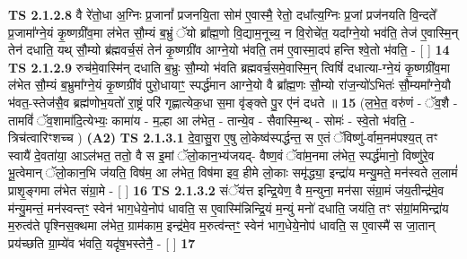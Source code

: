 \documentclass[17pt]{extarticle}
\begin{document}
                  \newline
                                \textbf{ TS 2.1.2.8} \newline
                  वै रे॑तो॒धा अ॒ग्निः प्र॒जानां᳚ प्रजनयि॒ता सोम॑ ए॒वास्मै॒ रेतो॒ दधा᳚त्य॒ग्निः प्र॒जां प्रज॑नयति वि॒न्दते᳚ प्र॒जामा᳚ग्ने॒यं कृ॒ष्णग्री॑व॒मा ल॑भेत सौ॒म्यं ब॒भ्रुं ॅयो ब्रा᳚ह्म॒णो वि॒द्याम॒नूच्य॒ न वि॒रोचे॑त॒ यदा᳚ग्ने॒यो भव॑ति॒ तेज॑ ए॒वास्मि॒न् तेन॑ दधाति॒ यथ् सौ॒म्यो ब्र॑ह्मवर्च॒सं तेन॑ कृ॒ष्णग्री॑व आग्ने॒यो भ॑वति॒ तम॑ ए॒वास्मा॒दप॑ हन्ति श्वे॒तो भ॑वति॒ - [  ] \textbf{  14} \newline
                  \newline
                                \textbf{ TS 2.1.2.9} \newline
                  रुच॑मे॒वास्मि॑न् दधाति ब॒भ्रुः सौ॒म्यो भ॑वति ब्रह्मवर्च॒समे॒वास्मि॒न् त्विषिं॑ दधात्या-ग्ने॒यं कृ॒ष्णग्री॑व॒मा ल॑भेत सौ॒म्यं ब॒भ्रुमा᳚ग्ने॒यं कृ॒ष्णग्री॑वं पुरो॒धायाꣳ॒॒ स्पर्द्ध॑मान आग्ने॒यो वै ब्रा᳚ह्म॒णः सौ॒म्यो रा॑ज॒न्यो॑ऽभितः॑ सौ॒म्यमा᳚ग्ने॒यौ भ॑वत॒-स्तेज॑सै॒व ब्रह्म॑णोभ॒यतो॑ रा॒ष्ट्रं परि॑ गृह्णात्येक॒धा स॒मा वृ॑ङ्क्ते पु॒र ए॑नं दधते ॥ \textbf{  15} \newline
                  \newline
                      (ल॒भे॒त॒ वरु॑णं - ॅव॒शै - तामविं॑ ॅव॒शामा॑दि॒त्येभ्यः॒ कामा॑य - म॒ल्हा आ ल॑भेत॒ - तान्ये॒व - सैवास्मि॒न्थ् - सोमः॑ - स्वे॒तो भ॑वति॒ - त्रिच॑त्वारिꣳशच्च )  \textbf{(A2)} \newline \newline
                                        \textbf{ TS 2.1.3.1} \newline
                  दे॒वा॒सु॒रा ए॒षु लो॒केष्व॑स्पर्द्धन्त॒ स ए॒तं ॅविष्णु॑-र्वाम॒नम॑पश्य॒त् तꣳ स्वायै॑ दे॒वता॑या॒ आऽल॑भत॒ ततो॒ वै स इ॒मां ॅलो॒कान॒भ्य॑जयद्- वैष्ण॒वं ॅवा॑म॒नमा ल॑भेत॒ स्पर्द्ध॑मानो॒ विष्णु॑रे॒व भू॒त्वेमान् ॅलो॒कान॒भि ज॑यति॒ विष॑म॒ आ ल॑भेत॒ विष॑मा इव॒ हीमे लो॒काः समृ॑द्ध्या॒ इन्द्रा॑य मन्यु॒मते॒ मन॑स्वते ल॒लामं॑ प्राशृ॒ङ्गमा ल॑भेत संग्रा॒मे - [  ] \textbf{  16} \newline
                  \newline
                                \textbf{ TS 2.1.3.2} \newline
                  संॅय॑त्त इन्द्रि॒येण॒ वै म॒न्युना॒ मन॑सा संग्रा॒मं ज॑य॒तीन्द्र॑मे॒व म॑न्यु॒मन्तं॒ मन॑स्वन्तꣳ॒॒ स्वेन॑ भाग॒धेये॒नोप॑ धावति॒ स ए॒वास्मि॑न्निन्द्रि॒यं म॒न्युं मनो॑ दधाति॒ जय॑ति॒ तꣳ स॑ग्रां॒ममिन्द्रा॑य म॒रुत्व॑ते पृश्निस॒क्थमा ल॑भेत॒ ग्राम॑काम॒ इन्द्र॑मे॒व म॒रुत्व॑न्तꣳ॒॒ स्वेन॑ भाग॒धेये॒नोप॑ धावति॒ स ए॒वास्मै॑ स जा॒तान् प्रय॑च्छति ग्रा॒म्ये॑व भ॑वति॒ यदृ॑ष॒भस्तेनै॒ - [  ] \textbf{  17} \newline
\end{document}
